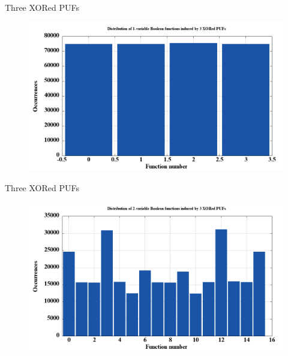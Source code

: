 \documentclass[10pt, compress]{beamer}
\begin{document}
\begin{frame}{Three XORed PUFs}
    \begin{figure}
        \centering
        \includegraphics[width=\textwidth]{figures/dist/distribution_of_1-variable_boolean_functions_induced_by_3_xored_pufs.png}
    \end{figure}
\end{frame}

\begin{frame}{Three XORed PUFs}
    \begin{figure}
        \centering
        \includegraphics[width=\textwidth]{figures/dist/distribution_of_2-variable_boolean_functions_induced_by_3_xored_pufs.png}
    \end{figure}
\end{frame}
\end{document}

